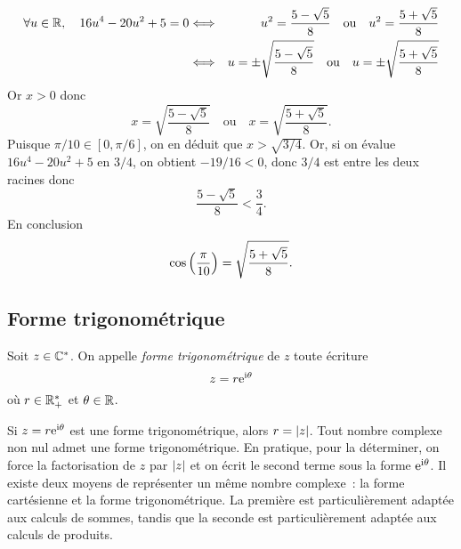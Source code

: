\documentclass{magnolia}
\begin{document}
\begin{exos}
\begin{sol}
\begin{eqnarray*}
\forall u\in\mathbb{R},\quad 16u^4-20u^2+5=0
&\Longleftrightarrow& u^2=\frac{5-\sqrt{5}}{8} \quad\text{ou}\quad  u^2=\frac{5+\sqrt{5}}{8}\\
&\Longleftrightarrow& u=\pm\sqrt{\frac{5-\sqrt{5}}{8}} \quad\text{ou}\quad  u=\pm\sqrt{\frac{5+\sqrt{5}}{8}}
\end{eqnarray*}
Or $x>0$ donc
\[x=\sqrt{\frac{5-\sqrt{5}}{8}} \quad\text{ou}\quad x=\sqrt{\frac{5+\sqrt{5}}{8}}.\]
Puisque $\pi/10\in[0,\pi/6]$, on en déduit que $x>\sqrt{3/4}$. Or, si on évalue $16u^4-20u^2+5$ en $3/4$, on obtient $-19/16<0$, donc $3/4$ est entre les deux racines donc
\[\frac{5-\sqrt{5}}{8}<\frac{3}{4}.\]
En conclusion
\[\cos\left(\frac{\pi}{10}\right)=\sqrt{\frac{5+\sqrt{5}}{8}}.\]
\end{sol}
\end{exos}



\subsection{Forme trigonométrique}

\begin{definition}
Soit $z\in\mathbb{C}^*$. On appelle \emph{forme trigonométrique} de $z$ toute écriture
\[z=r {\rm e}^{{\rm i}\theta}\]
où $r\in\mathbb{R}_+^*$ et $\theta\in\mathbb{R}$.
\end{definition}

\begin{remarques}
\remarque Si $z=r{\rm e}^{{\rm i}\theta}$ est une forme trigonométrique, alors $r=\left|z\right|$.
\remarque Tout nombre complexe non nul admet une forme trigonométrique. En pratique,
pour la déterminer, on force la factorisation de $z$ par $\left|z\right|$ et on écrit le second terme sous la forme ${\rm e}^{{\rm i}\theta}$.
\remarque Il existe deux moyens de représenter un même nombre
  complexe~: la forme cartésienne et la forme trigonométrique. La première
  est particulièrement adaptée aux calculs de sommes, tandis que la seconde
  est particulièrement adaptée aux calculs de produits.
\end{remarques}
\end{document}

